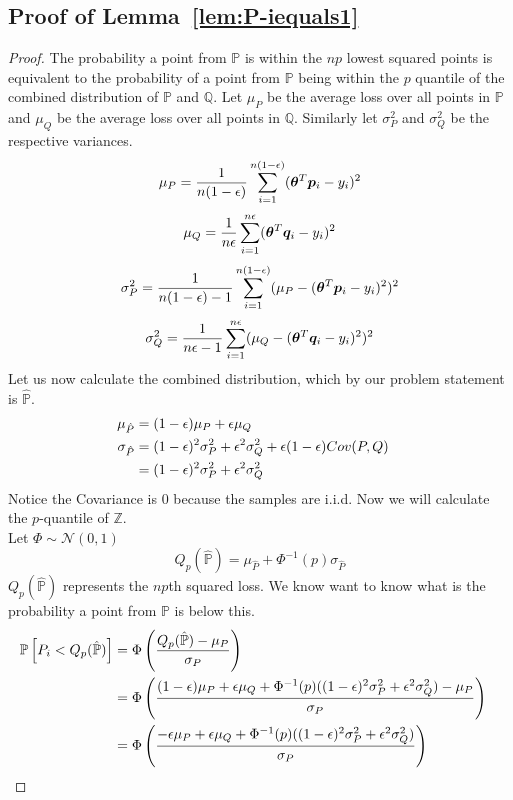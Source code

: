 \documentclass{article} %
\begin{document}
\begin{appendices}
	\subsection{Proof of Lemma~\ref{lem:P-iequals1}}
	\label{app:P-iequals1}
	\begin{proof}
		The probability a point from $\mathbb{P}$ is within the $np$ lowest squared points is equivalent to the probability of a point from $\mathbb{P}$ being within the $p$ quantile of the combined distribution of $\mathbb{P}$ and $\mathbb{Q}$. Let $\mu_P$ be the average loss over all points in $\mathbb{P}$ and $\mu_Q$ be the average loss over all points in $\mathbb{Q}$. Similarly let $\sigma_P^2$ and $\sigma_Q^2$ be the respective variances.
		\begin{equation}
			\mu_P = \frac{1}{n(1-{\epsilon})}\sum_{i=1}^{n(1-{\epsilon})}({\bm{\theta}}^T{\bm{p}}_i - y_i)^2
		\end{equation}
		\begin{equation}
			\mu_Q = \frac{1}{n{\epsilon}}\sum_{i=1}^{n{\epsilon}}({\bm{\theta}}^T{\bm{q}}_i - y_i)^2
		\end{equation}
		\begin{equation}
			\sigma_P^2 = \frac{1}{n(1-{\epsilon}) - 1}\sum_{i=1}^{n(1-{\epsilon})}(\mu_P - ({\bm{\theta}}^T{\bm{p}}_i - y_i)^2)^2
		\end{equation}
		\begin{equation}
			\sigma_Q^2 = \frac{1}{n{\epsilon} - 1}\sum_{i=1}^{n{\epsilon}}(\mu_Q - ({\bm{\theta}}^T{\bm{q}}_i - y_i)^2)^2
		\end{equation}
		Let us now calculate the combined distribution, which by our problem statement is $\hat{\mathbb{P}}$.
		\begin{align}
			\mu_{\hat{P}} &= (1-{\epsilon})\mu_P + {\epsilon} \mu_Q &&\\
			\sigma_{\hat{P}} &= (1-{\epsilon})^2 \sigma_P^2 + {\epsilon}^2\sigma_Q^2 + {\epsilon}(1-{\epsilon})Cov(P,Q) &&\\
			&= (1-{\epsilon})^2\sigma_P^2 + {\epsilon}^2\sigma_Q^2 &&
		\end{align}
		Notice the Covariance is 0 because the samples are i.i.d. Now we will calculate the $p$-quantile of $\mathbb{Z}$. \\
		Let $\Phi \sim \mathcal{N}(0,1)$ 
		\begin{equation}
			Q_p(\hat{\mathbb{P}}) = \mu_{\hat{P}} + \Phi^{-1}(p)\sigma_{\hat{P}}
		\end{equation}
		$Q_p(\hat{\mathbb{P}})$ represents the $np$th squared loss. We know want to know what is the probability a point from $\mathbb{P}$ is below this.
		\begin{align}
			\mathbb{P}\left[P_i < Q_p(\hat{\mathbb{P}})\right] &= \Phi\left(\frac{Q_p(\hat{\mathbb{P}}) - \mu_{P}}{\sigma_P}\right) &&\\
			&= \Phi\left(\frac{(1-{\epsilon})\mu_P + {\epsilon}\mu_Q + \Phi^{-1}(p)((1-{\epsilon})^2\sigma^2_P + {\epsilon}^2\sigma^2_Q) - \mu_P}{\sigma_P}\right) &&\\
			&= \Phi\left(\frac{-{\epsilon}\mu_P + {\epsilon}\mu_Q + \Phi^{-1}(p)((1-{\epsilon})^2\sigma^2_P + {\epsilon}^2\sigma^2_Q) }{\sigma_P}\right)
		\end{align}
	\end{proof}
		

\end{appendices}
\end{document}
